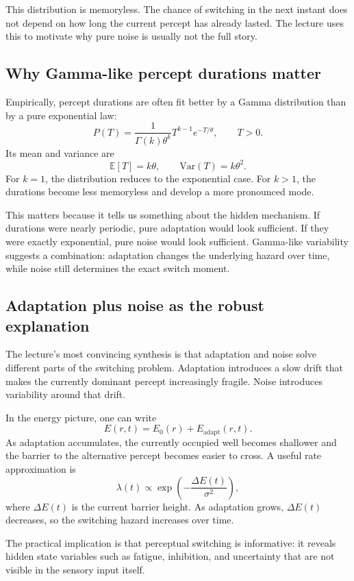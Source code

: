 This distribution is memoryless. The chance of switching in the next instant does not depend on how long the current percept has already lasted. The lecture uses this to motivate why pure noise is usually not the full story.

\subsection{Why Gamma-like percept durations matter}

Empirically, percept durations are often fit better by a Gamma distribution than by a pure exponential law:
\[
P(T)=\frac{1}{\Gamma(k)\theta^k}T^{k-1}e^{-T/\theta},
\qquad T>0.
\]
Its mean and variance are
\[
\mathbb E[T]=k\theta,
\qquad
\mathrm{Var}(T)=k\theta^2.
\]
For \(k=1\), the distribution reduces to the exponential case. For \(k>1\), the durations become less memoryless and develop a more pronounced mode.

This matters because it tells us something about the hidden mechanism. If durations were nearly periodic, pure adaptation would look sufficient. If they were exactly exponential, pure noise would look sufficient. Gamma-like variability suggests a combination: adaptation changes the underlying hazard over time, while noise still determines the exact switch moment.

\subsection{Adaptation plus noise as the robust explanation}

The lecture's most convincing synthesis is that adaptation and noise solve different parts of the switching problem. Adaptation introduces a slow drift that makes the currently dominant percept increasingly fragile. Noise introduces variability around that drift.

In the energy picture, one can write
\[
E(r,t)=E_0(r)+E_{\mathrm{adapt}}(r,t).
\]
As adaptation accumulates, the currently occupied well becomes shallower and the barrier to the alternative percept becomes easier to cross. A useful rate approximation is
\[
\lambda(t) \propto \exp\!\left(-\frac{\Delta E(t)}{\sigma^2}\right),
\]
where \(\Delta E(t)\) is the current barrier height. As adaptation grows, \(\Delta E(t)\) decreases, so the switching hazard increases over time.

The practical implication is that perceptual switching is informative: it reveals hidden state variables such as fatigue, inhibition, and uncertainty that are not visible in the sensory input itself.

